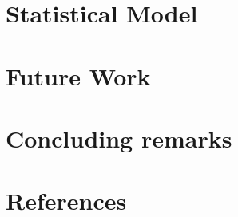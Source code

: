 \documentclass[12pt]{article}
\begin{document}
\section{Statistical Model}
\section{Future Work}
\section{Concluding remarks}
\section{References}
\end{document}
